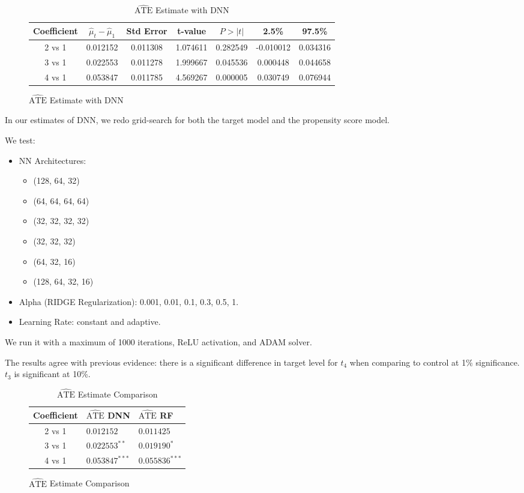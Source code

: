 \documentclass{article}
\begin{document}
\begin{figure}[H]
  \begin{table}[H]
  \centering
  \begin{tabular}{|ccccccc|}
    \hline
    Coefficient & $\hat{\mu}_t - \hat{\mu}_1$	& Std Error &	t-value	& $P>|t|$	& 2.5\%	& 97.5\% \\
    \hline
    2 vs 1	& 0.012152 & 0.011308	& 1.074611	& 0.282549 &	-0.010012 & 0.034316 \\
    3 vs 1	& 0.022553 & 0.011278	& 1.999667	& 0.045536 &	 0.000448 & 0.044658 \\
    4 vs 1	& 0.053847 & 0.011785	& 4.569267	& 0.000005 &	 0.030749 & 0.076944 \\
    \hline
  \end{tabular}
  \caption{$\hat{\text{ATE}}$ Estimate with DNN}
\end{table}
\end{figure}

In our estimates of DNN, we redo grid-search for both the target model and the propensity score model.

We test:
\begin{itemize}
  \item NN Architectures:
  \begin{itemize}
    \item (128, 64, 32)
    \item (64, 64, 64, 64)
    \item (32, 32, 32, 32)
    \item (32, 32, 32)
    \item (64, 32, 16)
    \item (128, 64, 32, 16)
  \end{itemize}
  \item Alpha (RIDGE Regularization): 0.001, 0.01, 0.1, 0.3, 0.5, 1.
  \item Learning Rate: constant and adaptive.
\end{itemize}

We run it with a maximum of 1000 iterations, ReLU activation, and ADAM solver.

The results agree with previous evidence: there is a significant difference in target level for $t_4$ when comparing to control at 1\% significance. $t_3$ is significant at 10\%.

\begin{figure}[H]
  \begin{table}[H]
  \centering
  \begin{tabular}{|cll|}
    \hline
    Coefficient & $\hat{\text{ATE}}$ DNN & $\hat{\text{ATE}}$ RF \\
    \hline
    2 vs 1	& $0.012152$ & $0.011425$ \\
    3 vs 1	& $0.022553^{**}$ & $0.019190^{*}$ \\
    4 vs 1	& $0.053847^{***}$ & $0.055836^{***}$ \\
    \hline
  \end{tabular}
  \caption{$\hat{\text{ATE}}$ Estimate Comparison}
\end{table}
\end{figure}
\end{document}
